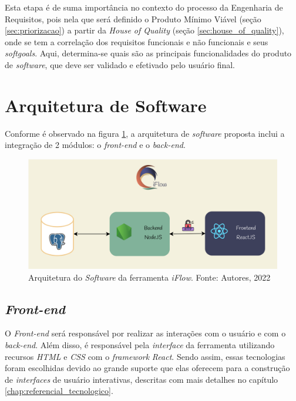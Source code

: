 Esta etapa é de suma importância no contexto do processo da Engenharia de Requisitos, pois nela que será definido o Produto Mínimo Viável (seção \ref{sec:priorizacao}) a partir da \textit{House of Quality} (seção \ref{sec:house_of_quality}), onde se tem a correlação dos requisitos funcionais e não funcionais e seus \textit{softgoals}. Aqui, determina-se quais são as principais funcionalidades do produto de \textit{software}, que deve ser validado e efetivado pelo usuário final.

\section{Arquitetura de Software}
Conforme é observado na figura \ref{fig:arquitetura}, a arquitetura de \textit{software} proposta inclui a integração de 2 módulos: o \textit{front-end} e o \textit{back-end}.

\begin{figure}[H]
    \begin{center}
        \includegraphics[scale=1.0]{figuras/Proposta/arquitetura.png}
        \caption{{Arquitetura do \textit{Software} da ferramenta \textit{iFlow}. Fonte: Autores, 2022}}
        \label{fig:arquitetura}
    \end{center}
\end{figure}

\subsection{\textit{Front-end}}
O \textit{Front-end} será responsável por realizar as interações com o usuário e com o \textit{back-end}. Além disso, é responsável pela \textit{interface} da ferramenta utilizando recursos \textit{HTML} e \textit{CSS} com o \textit{framework} \textit{React}. Sendo assim, essas tecnologias foram escolhidas devido ao grande suporte que elas oferecem para a construção de \textit{interfaces} de usuário interativas, descritas com mais detalhes no capítulo \ref{chap:referencial_tecnologico}.

